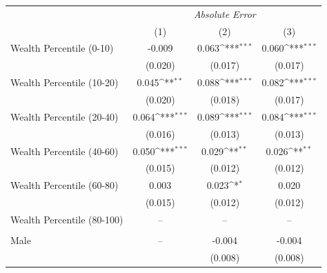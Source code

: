 \def\sym#1{\ifmmode^{#1}\else\(^{#1}\)\fi}

\begin{tabular*}{\textwidth}{@{\extracolsep{\fill}} l c c c}
\hline\hline
& \multicolumn{3}{c}{\emph{Absolute Error}}\\
& (1)  & (2)  & (3) \\
\hline
Wealth Percentile (0-10)                  &  -0.009                  & 0.063\sym{***}   & 0.060\sym{***}\\
                                                         & (0.020)                  &(0.017)                & (0.017) \\
Wealth Percentile (10-20)                &  0.045\sym{**}      & 0.088\sym{***}   & 0.082\sym{***} \\
                                                         & (0.020)                  &  (0.018)              &  (0.017)  \\                                                               
Wealth Percentile (20-40)                & 0.064\sym{***}      & 0.089\sym{***}   & 0.084\sym{***} \\
                                                         &  (0.016)                 &(0.013)                &  (0.013)  \\                                                               
Wealth Percentile (40-60)                & 0.050\sym{***}      & 0.029\sym{**}     & 0.026\sym{**} \\
                                                         &  (0.015)                 & (0.012)               &  (0.012)  \\                                                                                                                              
Wealth Percentile (60-80)                & 0.003                    & 0.023\sym{*}      & 0.020\\
                                                        &  (0.015)                 &  (0.012)              &  (0.012)  \\
Wealth Percentile (80-100)              & --              & --               & --  \\
                                                               &                 &                  &     \\
\hline
Male                                                       & --              & -0.004                              & -0.004     \\
                                                               &                 &  (0.008)                            &   (0.008)  \\

\end{tabular*}
